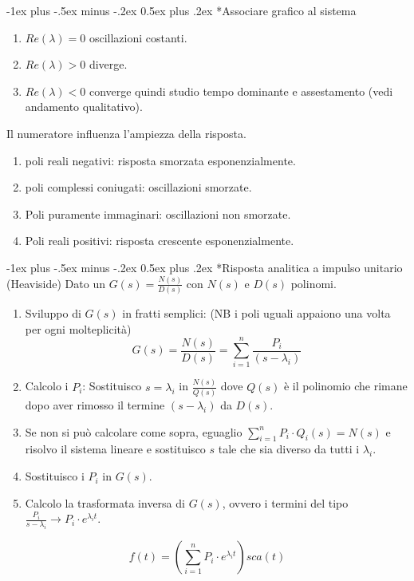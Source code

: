 \documentclass[10pt,landscape, a4paper]{scrartcl} %
\makeatletter
\renewcommand{\section}{\@startsection{section}{1}{0mm}%
                                {-1ex plus -.5ex minus -.2ex}%
                                {0.5ex plus .2ex}%
                                {\normalfont\large\bfseries}}
\makeatother
\begin{document}
\begin{multicols*}{3}
\section*{Associare grafico al sistema}
\begin{enumerate}
	\item $Re(\lambda) = 0$ oscillazioni costanti.
	\item $Re(\lambda) > 0$ diverge.
	\item $Re(\lambda) < 0$ converge quindi studio tempo dominante e assestamento (vedi andamento qualitativo).
\end{enumerate}


Il numeratore influenza l'ampiezza della risposta.
\begin{enumerate}
	\item poli reali negativi: risposta smorzata esponenzialmente.
	\item poli complessi coniugati: oscillazioni smorzate.
	\item Poli puramente immaginari: oscillazioni non smorzate.
	\item Poli reali positivi: risposta crescente esponenzialmente.
\end{enumerate}



\section*{Risposta analitica a impulso unitario (Heaviside)}
Dato un $G(s) = \frac{N(s)}{D(s)}$ con $N(s)$ e $D(s)$ polinomi.\\
\begin{enumerate}
	\item Sviluppo di $G(s)$ in fratti semplici: (NB i poli uguali appaiono una volta per ogni molteplicità)
	\begin{equation}
		G(s) = \frac{N(s)}{D(s)} = \sum_{i=1}^{n} \frac{P_i}{(s - \lambda_i)}
	\end{equation}
	\item Calcolo i $P_i$: Sostituisco $s = \lambda_i$ in $\frac{N(s)}{Q(s)}$ dove $Q(s)$ è il polinomio che rimane dopo aver rimosso il termine $(s - \lambda_i)$ da $D(s)$.
	\item Se non si può calcolare come sopra, eguaglio $\sum_{i=1}^{n} P_i\cdot Q_i(s) = N(s)$ e risolvo il sistema lineare e sostituisco $s$ tale che sia diverso da tutti i $\lambda_i$.
	\item Sostituisco i $P_i$ in $G(s)$.
	\item Calcolo la trasformata inversa di $G(s)$, ovvero i termini del tipo $\frac{P_i}{s - \lambda_i} \rightarrow P_i\cdot e^{\lambda_i t}$.
\end{enumerate}
\begin{equation}
	f(t) = \left(\sum_{i=1}^{n} P_i\cdot e^{\lambda_i t}\right)sca(t)
\end{equation}






\end{multicols*}
\end{document}
